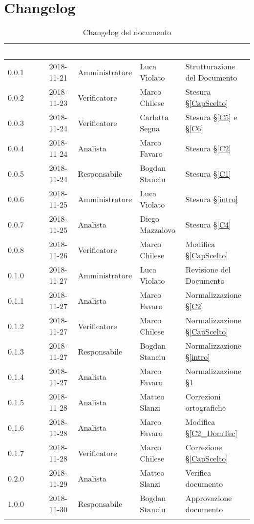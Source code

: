 \section{Changelog}\label{changelog}

\begin{center}
\begin{longtable}[c]{|m{}|m{}|m{}|m{}|p{}|}
\hline
\rowcolor{bluelogo}\textbf{\textcolor{white}{Versione}} & \textbf{\textcolor{white}{Data}}  & \textbf{\textcolor{white}{Ruolo}} & \textbf{\textcolor{white}{Autore}} & \textbf{\textcolor{white}{Descrizione}} \\
\hline \hline
\endhead
0.0.1 & 2018-11-21  & Amministratore & Luca Violato & Strutturazione del Documento \\
\hline
\rowcolor{grigio}0.0.2 & 2018-11-23  & Verificatore & Marco Chilese & Stesura §\ref{CapScelto} \\
\hline
0.0.3 & 2018-11-24  & Verificatore & Carlotta Segna & Stesura §\ref{C5} e §\ref{C6} \\
\hline
\rowcolor{grigio}0.0.4 & 2018-11-24  & Analista & Marco Favaro & Stesura §\ref{C2} \\
\hline
0.0.5 & 2018-11-24  & Responsabile & Bogdan Stanciu & Stesura §\ref{C1}\\
\hline
\rowcolor{grigio}0.0.6 & 2018-11-25  & Amministratore & Luca Violato & Stesura §\ref{intro}\\
\hline
0.0.7 & 2018-11-25  & Analista & Diego Mazzalovo & Stesura §\ref{C4} \\
\hline
\rowcolor{grigio}0.0.8 & 2018-11-26  & Verificatore & Marco Chilese & Modifica §\ref{CapScelto} \\
\hline
0.1.0 & 2018-11-27  & Amministratore & Luca Violato & Revisione del Documento\\
\hline
\rowcolor{grigio}0.1.1 & 2018-11-27 & Analista & Marco Favaro  & Normalizzazione §\ref{C2}\\
\hline
0.1.2 & 2018-11-27  & Verificatore & Marco Chilese & Normalizzazione §\ref{CapScelto}\\
\hline
\rowcolor{grigio}0.1.3 & 2018-11-27  & Responsabile & Bogdan Stanciu & Normalizzazione §\ref{intro}\\
\hline
0.1.4 & 2018-11-27  & Analista & Marco Favaro & Normalizzazione §\ref{changelog}\\
\hline
\rowcolor{grigio}0.1.5 & 2018-11-28 & Analista & Matteo Slanzi & Correzioni ortografiche\\
\hline
0.1.6 & 2018-11-28 & Analista & Marco Favaro & Modifica §\ref{C2_DomTec}\\
\hline
\rowcolor{grigio}0.1.7 & 2018-11-28 & Verificatore & Marco Chilese  & Correzione §\ref{CapScelto}\\
\hline
0.2.0 & 2018-11-29 & Analista & Matteo Slanzi  & Verifica documento\\
\hline
\rowcolor{grigio}1.0.0 & 2018-11-30 & Responsabile & Bogdan Stanciu & Approvazione documento\\
\hline
\caption{Changelog del documento}
\end{longtable}
\end{center}
